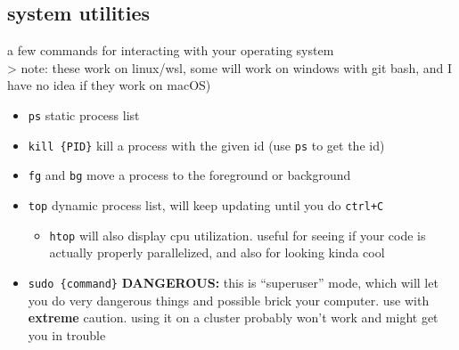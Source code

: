 \documentclass[
]{article}
\newenvironment{Shaded}{}{}
\newcommand{\AttributeTok}[1]{\textcolor[rgb]{0.49,0.56,0.16}{#1}}
\newcommand{\BuiltInTok}[1]{#1}
\newcommand{\FunctionTok}[1]{\textcolor[rgb]{0.02,0.16,0.49}{#1}}
\newcommand{\KeywordTok}[1]{\textcolor[rgb]{0.00,0.44,0.13}{\textbf{#1}}}
\newcommand{\NormalTok}[1]{#1}
\newcommand{\OperatorTok}[1]{\textcolor[rgb]{0.40,0.40,0.40}{#1}}
\newcommand{\StringTok}[1]{\textcolor[rgb]{0.25,0.44,0.63}{#1}}
\newcommand{\VariableTok}[1]{\textcolor[rgb]{0.10,0.09,0.49}{#1}}
\providecommand{\tightlist}{%
  \setlength{\itemsep}{0pt}\setlength{\parskip}{0pt}}
\begin{document}
\begin{Shaded}
\end{Shaded}

\hypertarget{system-utilities}{%
\subsection{system utilities}\label{system-utilities}}

a few commands for interacting with your operating system\\
\textgreater{} note: these work on linux/wsl, some will work on windows
with git bash, and I have no idea if they work on macOS)

\begin{itemize}
\tightlist
\item
  \texttt{ps} static process list
\item
  \texttt{kill\ \{PID\}} kill a process with the given id (use
  \texttt{ps} to get the id)
\item
  \texttt{fg} and \texttt{bg} move a process to the foreground or
  background
\item
  \texttt{top} dynamic process list, will keep updating until you do
  \texttt{ctrl+C}

  \begin{itemize}
  \tightlist
  \item
    \texttt{htop} will also display cpu utilization. useful for seeing
    if your code is actually properly parallelized, and also for looking
    kinda cool
  \end{itemize}
\item
  \texttt{sudo\ \{command\}} \textbf{DANGEROUS:} this is ``superuser''
  mode, which will let you do very dangerous things and possible brick
  your computer. use with \textbf{extreme} caution. using it on a
  cluster probably won't work and might get you in trouble
\end{itemize}
\end{document}

